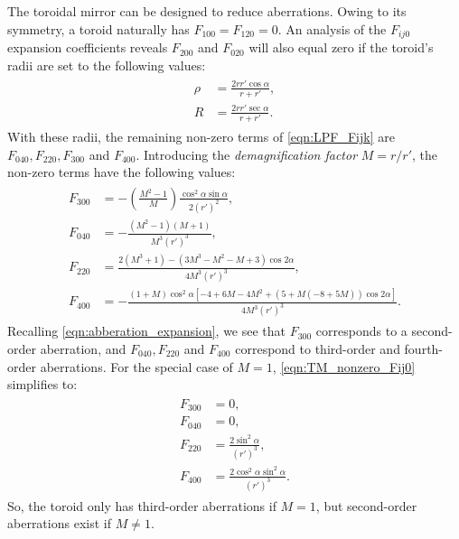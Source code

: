 The toroidal mirror can be designed to reduce aberrations. Owing to its symmetry, a toroid naturally has ${F_{100} = F_{120} = 0}$. An analysis of the $F_{ij0}$ expansion coefficients reveals $F_{200}$ and $F_{020}$ will also equal zero if the toroid's radii are set to the following values:
\begin{gather}
\begin{aligned}
\rho &= \frac{2 r r' \cos \alpha}{r + r'}, \\
R &= \frac{2 r r' \sec \alpha}{r+r'}.
\end{aligned} 
\end{gather}
With these radii, the remaining non-zero terms of \cref{eqn:LPF_Fijk} are $F_{040}, F_{220}, F_{300}$ and $F_{400}$. Introducing the \textit{demagnification factor} $M = r / r'$, the non-zero terms have the following values:
\begin{gather}
\begin{aligned}
F_{300} &= - \left( \frac{M^2-1}{M} \right) \frac{\cos^2 \alpha \sin \alpha}{2 (r')^2}, \\
F_{040} &= - \frac{(M^2-1)(M+1)}{M^3 (r')^3}, \\
F_{220} &= \frac{2 (M^3+1) - (3M^3 - M^2 - M + 3) \cos 2 \alpha}{4 M^3 (r')^3}, \\
F_{400} &= - \frac{(1+M) \cos^2 \alpha \left[-4 + 6M -4M^2 + (5+M(-8+5M)) \cos 2 \alpha\right]}{4 M^3 (r')^3}.
\end{aligned}
\label{eqn:TM_nonzero_Fij0}
\end{gather}
Recalling \cref{eqn:abberation_expansion}, we see that $F_{300}$ corresponds to a second-order aberration, and $F_{040}, F_{220}$ and $F_{400}$ correspond to third-order and fourth-order aberrations. For the special case of $M=1$, \cref{eqn:TM_nonzero_Fij0} simplifies to:
\begin{gather}
\begin{aligned}
F_{300} &= 0, \\
F_{040} &= 0, \\
F_{220} &= \frac{2 \sin^2 \alpha}{(r')^3}, \\
F_{400} &= \frac{2 \cos^2 \alpha \sin^2 \alpha}{(r')^3}.
\end{aligned}
\end{gather}
So, the toroid only has third-order aberrations if $M=1$, but second-order aberrations exist if $M \ne 1$.

